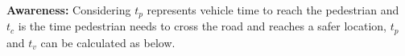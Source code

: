 









\newpara
\textbf{Awareness:}
Considering ${t_p}$ represents vehicle time to reach the pedestrian and \\
${t_c}$ is the time pedestrian needs to cross the road and reaches a safer location,
${t_p}$ and ${t_v}$  can be calculated as below.

